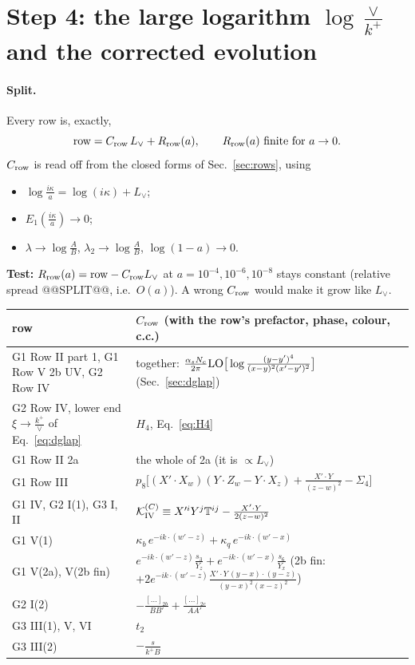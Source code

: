 \documentclass[10pt]{article}
\numberwithin{equation}{section}
\newcommand{\new}[1]{{\color{blue}#1}}
\newcommand{\Lv}{L_{\vee}}
\newcommand{\KK}{\mathcal K}
\begin{document}
\section{Step 4: the large logarithm \texorpdfstring{$\log\frac{\vee}{k^+}$}{log(vee/k+)} and the corrected evolution}\label{sec:split}
\paragraph{Split.} Every row is, exactly,
\begin{equation}
\text{row}=C_{\rm row}\,\Lv+R_{\rm row}(a),\qquad R_{\rm row}(a)\ \text{finite for }a\to0.
\end{equation}
$C_{\rm row}$ is read off from the closed forms of Sec.~\ref{sec:rows}, using
\begin{itemize}
\item $\log\frac{i\kappa}{a}=\log(i\kappa)+\Lv$;
\item $E_1(\frac{i\kappa}{a})\to0$;
\item $\lambda\to\log\frac AB$, $\lambda_2\to\log\frac AB$, $\log(1-a)\to0$.
\end{itemize}
\textbf{Test:} $R_{\rm row}(a)={\rm row}-C_{\rm row}\Lv$ at $a=10^{-4},10^{-6},10^{-8}$ stays constant (relative spread @@SPLIT@@, i.e.\ $O(a)$). A wrong $C_{\rm row}$ would make it grow like $\Lv$.
\begin{center}\small
\begin{tabular}{@{}ll@{}}\toprule
row & $C_{\rm row}$ (with the row's prefactor, phase, colour, c.c.)\\\midrule
G1 Row II part 1, G1 Row V 2b UV, G2 Row IV & together: $\frac{\alpha_sN_c}{2\pi}{\rm LO}\big[\log\frac{(y-y')^4}{(x-y)^2(x'-y')^2}\big]$ (Sec.~\ref{sec:dglap})\\
\new{G2 Row IV, lower end $\xi\to\frac{k^+}{\vee}$ of Eq.~\eqref{eq:dglap}} & \new{$H_4$, Eq.~\eqref{eq:H4}}\\
G1 Row II 2a & the whole of 2a (it is $\propto\Lv$)\\
G1 Row III & $p_8\big[(X'\!\cdot X_w)(Y\!\cdot Z_w-Y\!\cdot X_z)+\frac{X'\cdot Y}{(z-w)^2}-\Sigma_4\big]$\\
G1 IV, G2 I(1), G3 I, II & $\KK^{(C)}_{\rm IV}\equiv X'^iY^j\mathbb T^{ij}-\frac{X'\cdot Y}{2(z-w)^2}$\\
G1 V(1) & $\kappa_b\,e^{-ik\cdot(w'-z)}+\kappa_q\,e^{-ik\cdot(w'-x)}$\\
G1 V(2a), V(2b fin) & $e^{-ik\cdot(w'-z)}\frac{s_3}{Y_z}+e^{-ik\cdot(w'-x)}\frac{s_6}{Y_x}$ (2b fin: $+2e^{-ik\cdot(w'-z)}\frac{X'\cdot Y\,(y-x)\cdot(y-z)}{(y-x)^2(x-z)^2}$)\\
G2 I(2) & $-\frac{[\dots]_{2b}}{BB'}+\frac{[\dots]_{2c}}{AA'}$\\
G3 III(1), V, VI & $t_2$\\
G3 III(2) & $-\frac{s}{k^+B}$\\\bottomrule
\end{tabular}
\end{center}
\end{document}
